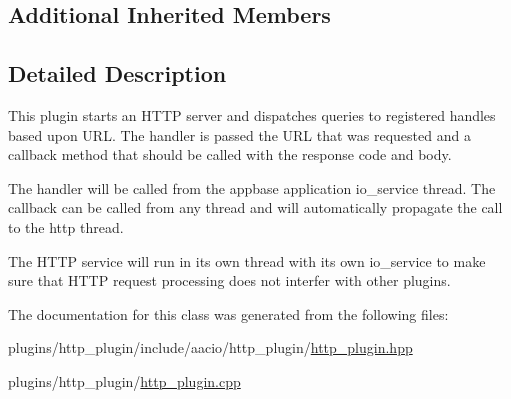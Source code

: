 \subsection*{Additional Inherited Members}


\subsection{Detailed Description}
This plugin starts an H\+T\+TP server and dispatches queries to registered handles based upon U\+RL. The handler is passed the U\+RL that was requested and a callback method that should be called with the response code and body.

The handler will be called from the appbase application io\+\_\+service thread. The callback can be called from any thread and will automatically propagate the call to the http thread.

The H\+T\+TP service will run in its own thread with its own io\+\_\+service to make sure that H\+T\+TP request processing does not interfer with other plugins. 

The documentation for this class was generated from the following files\+:\begin{DoxyCompactItemize}
\item 
plugins/http\+\_\+plugin/include/aacio/http\+\_\+plugin/\mbox{\hyperlink{http__plugin_8hpp}{http\+\_\+plugin.\+hpp}}\item 
plugins/http\+\_\+plugin/\mbox{\hyperlink{http__plugin_8cpp}{http\+\_\+plugin.\+cpp}}\end{DoxyCompactItemize}
